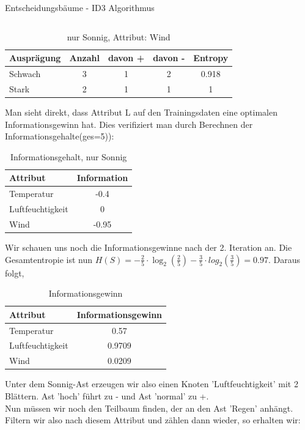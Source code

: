 \begin{task}[credit=16]{Entscheidungsbäume - ID3 Algorithmus}
\begin{subtask}[points=10,title=ID3 Algorithmus]
\begin{solution}
\begin{table}[H]
\begin{tabular}{l|c|c|c|c}
		\bottomrule
	\end{tabular}
\end{table}
\begin{table}[H]
	\centering
	\caption{nur Sonnig, Attribut: Wind}
	\begin{tabular}{l|c|c|c|c}
		\toprule
		\textbf{Ausprägung} & \textbf{Anzahl} & \textbf{davon +}  & \textbf{davon -} &\textbf{Entropy} \\
		\midrule
		Schwach&3&1&2&0.918\\
		Stark&2&1&1&1\\
		\bottomrule
	\end{tabular}
\end{table}
Man sieht direkt, dass Attribut L auf den Trainingsdaten eine optimalen Informationsgewinn hat. Dies verifiziert man durch Berechnen der Informationsgehalte(ges=5)):
\begin{table}[H]
	\centering
	\caption{Informationsgehalt, nur Sonnig}
	\begin{tabular}{l|c}
		\toprule
		\textbf{Attribut} & \textbf{Information}  \\
		\midrule
		Temperatur&-0.4\\
		Luftfeuchtigkeit & 0\\
		Wind&-0.95\\
		\bottomrule
	\end{tabular}
\end{table}
Wir schauen uns noch die Informationsgewinne nach der 2. Iteration an. Die Gesamtentropie ist nun $H(S) = -\frac{2}{5} \cdot \log_2(\frac{2}{5}) - \frac{3}{5} \cdot log_2(\frac{3}{5}) = 0.97$. Daraus folgt, 
\begin{table}[H]
	\centering
	\caption{Informationsgewinn}
	\begin{tabular}{l|c}
		\toprule
		\textbf{Attribut} & \textbf{Informationsgewinn}  \\
		\midrule
		Temperatur & 0.57\\
		Luftfeuchtigkeit & 0.9709\\
		Wind&0.0209\\
		\bottomrule
	\end{tabular}
\end{table}
Unter dem Sonnig-Ast erzeugen wir also einen Knoten 'Luftfeuchtigkeit' mit 2 Blättern. Ast 'hoch' führt zu - und Ast 'normal' zu +.\\
Nun müssen wir noch den Teilbaum finden, der an den Ast 'Regen' anhängt. Filtern wir also nach diesem Attribut und zählen dann wieder, so erhalten wir:
\begin{table}[H]

\end{table}
\end{solution}
\end{subtask}
\end{task}
